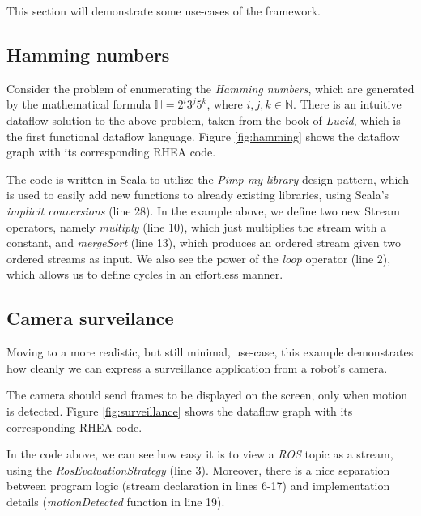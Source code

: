 \documentclass[sigplan,review,anonymous]{acmart}
\begin{document}
This section will demonstrate some use-cases of the framework.

\subsection{Hamming numbers}

Consider the problem of enumerating the
\textit{Hamming numbers}, which are generated by the mathematical formula
$\mathbb{H} = 2^i3^j5^k$, where $i,j,k \in \mathbb{N}$. There is an intuitive
dataflow solution to the above problem, taken from the book of \textit{Lucid},
which is the first functional dataflow language\cite{lucid}. Figure
\ref{fig:hamming} shows the dataflow graph with its corresponding \textsc{RHEA}
code.


The code is written in Scala to utilize the \textit{Pimp my library} design
pattern\cite{pimp}, which is used to easily add new functions to already
existing libraries, using Scala's \textit{implicit conversions} (line 28). In
the example above, we define two new Stream operators, namely \textit{multiply}
(line 10), which just multiplies the stream with a constant, and
\textit{mergeSort} (line 13), which produces an ordered stream given two ordered
streams as input. We also see the power of the \textit{loop} operator (line 2),
which allows us to define cycles in an effortless manner.

\subsection{Camera surveilance}

Moving to a more realistic, but still minimal, use-case, this example
demonstrates how cleanly we can express a surveillance application from a
robot's camera.

The camera should send frames to be displayed on the screen, only when motion is
detected. Figure \ref{fig:surveillance} shows the dataflow graph with its
corresponding \textsc{RHEA} code.


In the code above, we can see how easy it is to view a \textit{ROS} topic as a
stream, using the \textit{RosEvaluationStrategy} (line 3). Moreover, there is a
nice separation between program logic (stream declaration in lines 6-17) and
implementation details (\textit{motionDetected} function in line 19).
\end{document}
